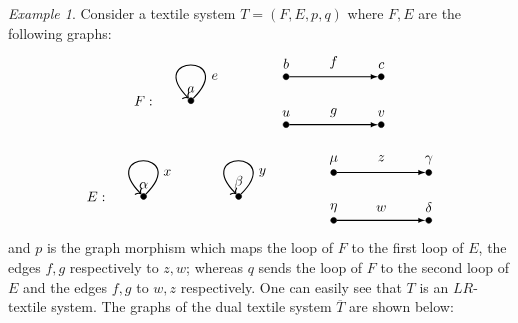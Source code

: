 \documentclass[a4paper,reqno,12pt]{amsart}
\theoremstyle{definition}
\theoremstyle{remark}
\newtheorem{example}[thm]{Example}
\begin{document}
\begin{example}\label{ex cycles in separate graphs is not sufficient}
Consider a textile system $T=(F,E,p,q)$ where $F,E$ are the following graphs:
\[
\begin{tikzpicture}[scale=1.2]
\node[inner sep=1.5pt, circle,draw,fill=black,label={$a$}] (A) at (0,0) {};	
\node[inner sep=1.5pt, circle,draw,fill=black,label={$b$}] (B) at (2,0.5) {};
\node[inner sep=1.5pt, circle,draw,fill=black,label={$c$}] (C) at (4,0.5) {};	
\node[inner sep=1.5pt, circle,draw,fill=black,label={$u$}] (D) at (2,-0.5) {};
\node[inner sep=1.5pt, circle,draw,fill=black,label={$v$}] (E) at (4,-0.5) {};
	
\path[->, black,thick, every loop/.style={looseness=35}](A)edge[in=135, out=45, loop] node [](d) {} (A);
\path[->,black, >=latex,thick] (B) edge [left] node[above=0.05cm]{} (C);
\path[->,black, >=latex,thick] (D) edge [left] node[above=0.05cm]{} (E);

\node at (0.5,0.5) {$e$};

\node at (3,0.8) {$f$};

\node at (3,-0.25) {$g$};

\node at (-1,0) {$F:$};
\end{tikzpicture}
\] 

\[
\begin{tikzpicture}[scale=1.2]
\node[inner sep=1.5pt, circle,draw,fill=black,label={$\alpha$}] (A1) at (-2,0) {};
\node[inner sep=1.5pt, circle,draw,fill=black,label={$\beta$}] (A) at (0,0) {};	
\node[inner sep=1.5pt, circle,draw,fill=black,label={$\mu$}] (B) at (2,0.5) {};
\node[inner sep=1.5pt, circle,draw,fill=black,label={$\gamma$}] (C) at (4,0.5) {};	
\node[inner sep=1.5pt, circle,draw,fill=black,label={$\eta$}] (D) at (2,-0.5) {};
\node[inner sep=1.5pt, circle,draw,fill=black,label={$\delta$}] (E) at (4,-0.5) {};
	
\path[->, black,thick, every loop/.style={looseness=35}](A)edge[in=135, out=45, loop] node [](d) {} (A);
\path[->, black,thick, every loop/.style={looseness=35}](A1)edge[in=135, out=45, loop] node [](d) {} (A1);
\path[->,black, >=latex,thick] (B) edge [left] node[above=0.05cm]{} (C);
\path[->,black, >=latex,thick] (D) edge [left] node[above=0.05cm]{} (E);

\node at (0.5,0.5) {$y$};

\node at (-1.5,0.5) {$x$};

\node at (3,0.8) {$z$};

\node at (3,-0.25) {$w$};

\node at (-3,0) {$E:$};
\end{tikzpicture}
\] 
and $p$ is the graph morphism which maps the loop of $F$ to the first loop of $E$, the edges $f,g$ respectively to $z,w$; whereas $q$ sends the loop of $F$ to the second loop of $E$ and the edges $f,g$ to $w,z$ respectively. One can easily see that $T$ is an $LR$-textile system. The graphs of the dual textile system $\overline{T}$ are shown below:


\end{example}
\end{document}
